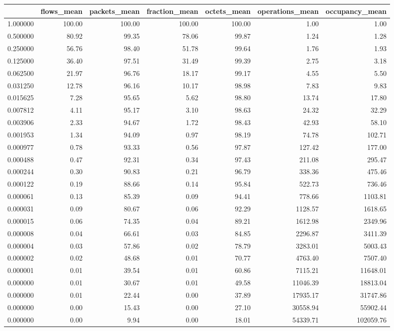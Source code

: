 \begin{tabular}{lrrrrrr}
\toprule
 & flows_mean & packets_mean & fraction_mean & octets_mean & operations_mean & occupancy_mean \\
\midrule
1.000000 & 100.00 & 100.00 & 100.00 & 100.00 & 1.00 & 1.00 \\
0.500000 & 80.92 & 99.35 & 78.06 & 99.87 & 1.24 & 1.28 \\
0.250000 & 56.76 & 98.40 & 51.78 & 99.64 & 1.76 & 1.93 \\
0.125000 & 36.40 & 97.51 & 31.49 & 99.39 & 2.75 & 3.18 \\
0.062500 & 21.97 & 96.76 & 18.17 & 99.17 & 4.55 & 5.50 \\
0.031250 & 12.78 & 96.16 & 10.17 & 98.98 & 7.83 & 9.83 \\
0.015625 & 7.28 & 95.65 & 5.62 & 98.80 & 13.74 & 17.80 \\
0.007812 & 4.11 & 95.17 & 3.10 & 98.63 & 24.32 & 32.29 \\
0.003906 & 2.33 & 94.67 & 1.72 & 98.43 & 42.93 & 58.10 \\
0.001953 & 1.34 & 94.09 & 0.97 & 98.19 & 74.78 & 102.71 \\
0.000977 & 0.78 & 93.33 & 0.56 & 97.87 & 127.42 & 177.00 \\
0.000488 & 0.47 & 92.31 & 0.34 & 97.43 & 211.08 & 295.47 \\
0.000244 & 0.30 & 90.83 & 0.21 & 96.79 & 338.36 & 475.46 \\
0.000122 & 0.19 & 88.66 & 0.14 & 95.84 & 522.73 & 736.46 \\
0.000061 & 0.13 & 85.39 & 0.09 & 94.41 & 778.66 & 1103.81 \\
0.000031 & 0.09 & 80.67 & 0.06 & 92.29 & 1128.57 & 1618.65 \\
0.000015 & 0.06 & 74.35 & 0.04 & 89.21 & 1612.98 & 2349.96 \\
0.000008 & 0.04 & 66.61 & 0.03 & 84.85 & 2296.87 & 3411.39 \\
0.000004 & 0.03 & 57.86 & 0.02 & 78.79 & 3283.01 & 5003.43 \\
0.000002 & 0.02 & 48.68 & 0.01 & 70.77 & 4763.40 & 7507.40 \\
0.000001 & 0.01 & 39.54 & 0.01 & 60.86 & 7115.21 & 11648.01 \\
0.000000 & 0.01 & 30.67 & 0.01 & 49.58 & 11046.39 & 18813.04 \\
0.000000 & 0.01 & 22.44 & 0.00 & 37.89 & 17935.17 & 31747.86 \\
0.000000 & 0.00 & 15.43 & 0.00 & 27.10 & 30558.94 & 55902.44 \\
0.000000 & 0.00 & 9.94 & 0.00 & 18.01 & 54339.71 & 102059.76 \\
\bottomrule
\end{tabular}
